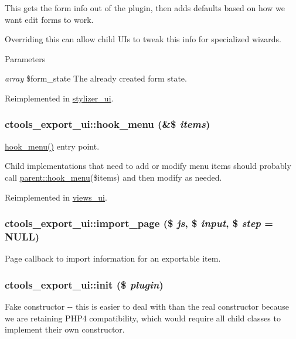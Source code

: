 This gets the form info out of the plugin, then adds defaults based on how we want edit forms to work.

Overriding this can allow child UIs to tweak this info for specialized wizards.


\begin{DoxyParams}{Parameters}
\item[{\em array}]\$form\_\-state The already created form state. \end{DoxyParams}


Reimplemented in \hyperlink{classstylizer__ui_a32963e1d98f25fb218bdfa3270286623}{stylizer\_\-ui}.\hypertarget{classctools__export__ui_a5ee980ee59378fdeb612e429e18f08c7}{
\subsubsection[{hook\_\-menu}]{\setlength{\rightskip}{0pt plus 5cm}ctools\_\-export\_\-ui::hook\_\-menu (\&\$ {\em items})}}
\label{classctools__export__ui_a5ee980ee59378fdeb612e429e18f08c7}
\hyperlink{classctools__export__ui_a5ee980ee59378fdeb612e429e18f08c7}{hook\_\-menu()} entry point.

Child implementations that need to add or modify menu items should probably call \hyperlink{group__hooks_ga5c95244fea59b25666e409759e133ded}{parent::hook\_\-menu}(\$items) and then modify as needed. 

Reimplemented in \hyperlink{classviews__ui_a2a5885b9b860fd53a304e1ac38237a56}{views\_\-ui}.\hypertarget{classctools__export__ui_a9b7e82eb64b9f7d5fa57ae2a7e9bcda2}{
\subsubsection[{import\_\-page}]{\setlength{\rightskip}{0pt plus 5cm}ctools\_\-export\_\-ui::import\_\-page (\$ {\em js}, \/  \$ {\em input}, \/  \$ {\em step} = {\ttfamily NULL})}}
\label{classctools__export__ui_a9b7e82eb64b9f7d5fa57ae2a7e9bcda2}
Page callback to import information for an exportable item. \hypertarget{classctools__export__ui_a6e2c9b8dca7d4f8ec8d7badaa1b51f48}{
\subsubsection[{init}]{\setlength{\rightskip}{0pt plus 5cm}ctools\_\-export\_\-ui::init (\$ {\em plugin})}}
\label{classctools__export__ui_a6e2c9b8dca7d4f8ec8d7badaa1b51f48}
Fake constructor -\/-\/ this is easier to deal with than the real constructor because we are retaining PHP4 compatibility, which would require all child classes to implement their own constructor. 


